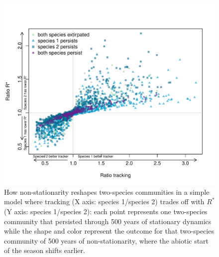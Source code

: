 \documentclass[11pt,letterpaper]{article}
\begin{document}
\begin{figure}[t!]
\centering
\includegraphics[width=1\textwidth]{..//..//R/graphs/modelruns/manuscript/alpharstar.pdf}
\caption{How non-stationarity reshapes two-species communities in a simple model where tracking (X axis: species 1/species 2) trades off with $R^*$ (Y axis: species 1/species 2): each point represents one two-species community that persisted through 500 years of stationary dynamics while the shape and color represent the outcome for that two-species community of 500 years of non-stationarity, where the abiotic start of the season shifts earlier.}
  \label{fig:alpharstar}
\end{figure}
\end{document}
